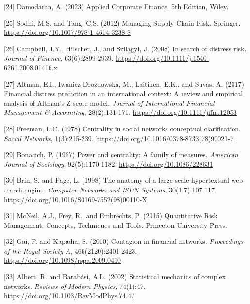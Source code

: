 \documentclass[a4 paper, 11pt,twoside]{article}
\newcommand{\0}{\Bf{0}}
\theoremstyle{definition}
\begin{document}
{\begin{thebibliography}{8}
{\label{ref24}[24] Damodaran, A. (2023) Applied Corporate Finance. 5th Edition, Wiley.

\label{ref25}[25] Sodhi, M.S. and Tang, C.S. (2012) Managing Supply Chain Risk. Springer. \href{https://doi.org/10.1007/978-1-4614-3238-8}{https://doi.org/10.1007/978-1-4614-3238-8}

\label{ref26}[26] Campbell, J.Y., Hilscher, J., and Szilagyi, J. (2008) In search of distress risk. \emph{Journal of Finance}, 63(6):2899-2939. \href{https://doi.org/10.1111/j.1540-6261.2008.01416.x}{https://doi.org/10.1111/j.1540-6261.2008.01416.x}

\label{ref27}[27] Altman, E.I., Iwanicz-Drozdowska, M., Laitinen, E.K., and Suvas, A. (2017) Financial distress prediction in an international context: A review and empirical analysis of Altman's Z-score model. \emph{Journal of International Financial Management \& Accounting}, 28(2):131-171. \href{https://doi.org/10.1111/jifm.12053}{https://doi.org/10.1111/jifm.12053}

\label{ref28}[28] Freeman, L.C. (1978) Centrality in social networks conceptual clarification. \emph{Social Networks}, 1(3):215-239. \href{https://doi.org/10.1016/0378-8733(78)90021-7}{https://doi.org/10.1016/0378-8733(78)90021-7}

\label{ref29}[29] Bonacich, P. (1987) Power and centrality: A family of measures. \emph{American Journal of Sociology}, 92(5):1170-1182. \href{https://doi.org/10.1086/228631}{https://doi.org/10.1086/228631}

\label{ref30}[30] Brin, S. and Page, L. (1998) The anatomy of a large-scale hypertextual web search engine. \emph{Computer Networks and ISDN Systems}, 30(1-7):107-117. \href{https://doi.org/10.1016/S0169-7552(98)00110-X}{https://doi.org/10.1016/S0169-7552(98)00110-X}

\label{ref31}[31] McNeil, A.J., Frey, R., and Embrechts, P. (2015) Quantitative Risk Management: Concepts, Techniques and Tools. Princeton University Press.

\label{ref32}[32] Gai, P. and Kapadia, S. (2010) Contagion in financial networks. \emph{Proceedings of the Royal Society A}, 466(2120):2401-2423. \href{https://doi.org/10.1098/rspa.2009.0410}{https://doi.org/10.1098/rspa.2009.0410}

\label{ref33}[33] Albert, R. and Barabási, A.L. (2002) Statistical mechanics of complex networks. \emph{Reviews of Modern Physics}, 74(1):47. \href{https://doi.org/10.1103/RevModPhys.74.47}{https://doi.org/10.1103/RevModPhys.74.47}

}
\end{thebibliography}}
\end{document}
